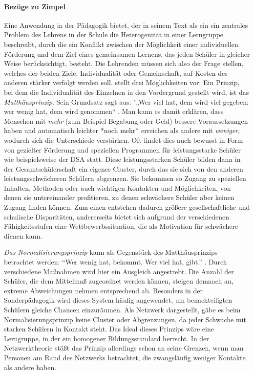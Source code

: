{\paragraph{Bezüge zu Zimpel}

Eine Anwendung in der Pädagogik bietet\citeauthor{Zimpel2012}, der in seinem Text als ein ein zentrales Problem des Lehrens in der Schule die Heterogenität in einer Lerngruppe beschreibt, durch die ein Konflikt zwischen der Möglichkeit einer individuellen Förderung und dem Ziel eines gemeinsamen Lernens, das jeden Schüler in gleicher Weise berücksichtigt, besteht.
Die Lehrenden müssen sich also der Frage stellen, welches der beiden Ziele, Individualität oder Gemeinschaft, auf Kosten des anderen stärker verfolgt werden soll.
\citeauthor{Zimpel2012} stellt drei Möglichkeiten vor:
Ein Prinzip, bei dem die Individualität des Einzelnen in den Vordergrund gestellt wird, ist das \emph{Matthäusprinzip}.
Sein Grundsatz sagt aus: "„Wer viel hat, dem wird viel gegeben; wer wenig hat, dem wird genommen“ \parencite[105]{Zimpel2012}.
Man kann es damit erklären, dass Menschen mit \emph{mehr} (zum Beispiel Begabung oder Geld) bessere Voraussetzungen haben und automatisch leichter *noch mehr* erreichen als andere mit  \emph{weniger}, wodurch sich die Unterschiede verstärken.
Oft findet dies auch bewusst in Form von gezielter Förderung und speziellen Programmen für leistungsstarke Schüler wie beispielsweise der DSA statt.
Diese leistungsstarken Schüler bilden dann in der Gesamtschülerschaft ein eigenes Cluster, durch das sie sich von den anderen leistungsschwächeren Schülern abgrenzen. Sie bekommen so Zugang zu speziellen Inhalten, Methoden oder auch wichtigen Kontakten und Möglichkeiten, von denen sie untereinander profitieren, zu denen schwächere Schüler aber keinen Zugang finden können.
Zum einen entstehen dadurch größere gesellschaftliche und schulische Disparitäten, andererseits bietet sich aufgrund der verschiedenen Fähigkeitsstufen eine Wettbewerbssituation, die als Motivation für schwächere dienen kann.

\emph{Das Normalisierungsprinzip} kann als Gegenstück des Matthäusprinzips betrachtet werden: ``Wer wenig hat, bekommt. Wer viel hat, gibt.'' \parencite[12]{Zimpel2012}.
Durch verschiedene Maßnahmen wird hier ein Ausgleich angestrebt.
Die Anzahl der Schüler, die dem Mittelmaß zugeordnet werden können, steigen demnach an, extreme Abweichungen nehmen entsprechend ab.
Besonders in der Sonderpädagogik wird dieses System häufig angewendet, um benachteiligten Schülern gleiche Chancen einzuräumen.
Als Netzwerk dargestellt, gäbe es beim Normalisierungsprinzip keine Cluster oder Abgrenzungen, da jeder Schwache mit starken Schülern in Kontakt steht.
Das Ideal dieses Prinzips wäre eine Lerngruppe, in der ein homogener Bildungsstandard herrscht.
In der Netzwerktheorie stößt das Prinzip allerdings schon an seine Grenzen, wenn man Personen am Rand des Netzwerks betrachtet, die zwangsläufig weniger Kontakte als andere haben.

}
